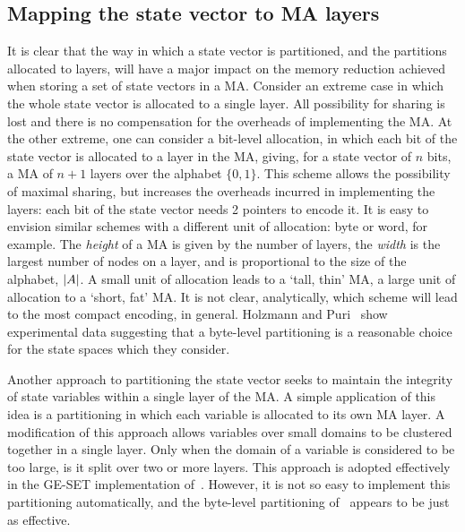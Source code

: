 \subsection{Mapping the state vector to MA layers}
It is clear that the way in which a state vector is partitioned, and
the partitions allocated to layers, will have a major impact on the
memory reduction achieved when storing a set of state vectors in a MA.
Consider an extreme case in which the whole state vector is allocated
to a single layer. All possibility for sharing is lost and there is no
compensation for the overheads of implementing the MA.  At the other
extreme, one can consider a bit-level allocation, in which each bit of
the state vector is allocated to a layer in the MA, giving, for a
state vector of $n$ bits, a MA of $n+1$ layers over the alphabet
$\{0,1\}$. This scheme allows the possibility of maximal sharing, but
increases the overheads incurred in implementing the layers: each bit
of the state vector needs 2 pointers to encode it.  It is easy to
envision similar schemes with a different unit of allocation: byte or
word, for example. The \emph{height} of a MA is given by the number of
layers, the \emph{width} is the largest number of nodes on a layer,
and is proportional to the size of the alphabet,
${\left|A\right|}$. A small unit of allocation leads to a `tall,
thin' MA, a large unit of allocation to a `short, fat' MA. It is not
clear, analytically, which scheme will lead to the most compact
encoding, in general. Holzmann and Puri~\cite{hp:99} show experimental
data suggesting that a byte-level partitioning is a reasonable choice
for the state spaces which they consider.

Another approach to partitioning the state vector seeks to maintain the
integrity of state variables within a single layer of the MA. A simple
application of this idea is a partitioning in which each variable is
allocated to its own MA layer. A modification of this approach allows
variables over small domains to be clustered together in a single
layer. Only when the domain of a variable is considered to be too
large, is it split over two or more layers. This approach is 
adopted effectively in the GE-SET implementation of~\cite{gre:96}. However,
it is not so easy to implement this partitioning automatically, and
the byte-level partitioning of~\cite{hp:99} appears to be just as effective.

